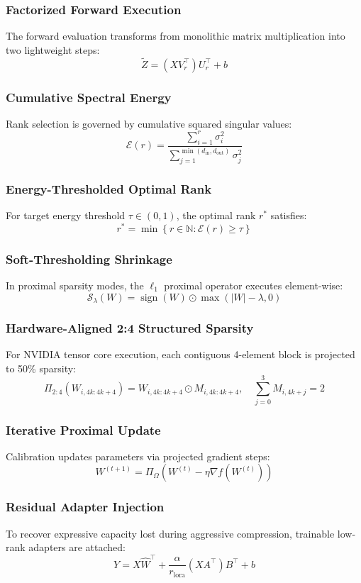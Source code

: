 \documentclass{article}
\begin{document}
\subsubsection{Factorized Forward Execution}
The forward evaluation transforms from monolithic matrix multiplication into two lightweight steps:
\[
\tilde{Z} = (X V_r^\top) U_r^\top + b
\]

\subsubsection{Cumulative Spectral Energy}
Rank selection is governed by cumulative squared singular values:
\[
\mathcal{E}(r) = \frac{\sum_{i=1}^{r} \sigma_i^2}{\sum_{j=1}^{\min(d_{\text{in}}, d_{\text{out}})} \sigma_j^2}
\]

\subsubsection{Energy-Thresholded Optimal Rank}
For target energy threshold $\tau \in (0, 1)$, the optimal rank $r^*$ satisfies:
\[
r^* = \min \left\{ r \in \mathbb{N} : \mathcal{E}(r) \ge \tau \right\}
\]

\subsubsection{Soft-Thresholding Shrinkage}
In proximal sparsity modes, the $\ell_1$ proximal operator executes element-wise:
\[
\mathcal{S}_\lambda(W) = \operatorname{sign}(W) \odot \max(|W| - \lambda, 0)
\]

\subsubsection{Hardware-Aligned 2:4 Structured Sparsity}
For NVIDIA tensor core execution, each contiguous 4-element block is projected to 50\% sparsity:
\[
\Pi_{2:4}(W_{i, 4k:4k+4}) = W_{i, 4k:4k+4} \odot M_{i, 4k:4k+4}, \quad \sum_{j=0}^{3} M_{i, 4k+j} = 2
\]

\subsubsection{Iterative Proximal Update}
Calibration updates parameters via projected gradient steps:
\[
W^{(t+1)} = \Pi_{\Omega}\left( W^{(t)} - \eta \nabla f(W^{(t)}) \right)
\]

\subsubsection{Residual Adapter Injection}
To recover expressive capacity lost during aggressive compression, trainable low-rank adapters are attached:
\[
Y = X \hat{W}^\top + \frac{\alpha}{r_{\text{lora}}} (X A^\top) B^\top + b
\]
\end{document}
